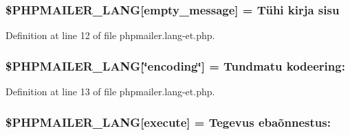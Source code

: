 \subsubsection[{\texorpdfstring{\$\+P\+H\+P\+M\+A\+I\+L\+E\+R\+\_\+\+L\+A\+NG}{$PHPMAILER_LANG}}]{\setlength{\rightskip}{0pt plus 5cm}\$P\+H\+P\+M\+A\+I\+L\+E\+R\+\_\+\+L\+A\+NG\mbox{[}\textquotesingle{}empty\+\_\+message\textquotesingle{}\mbox{]} = \textquotesingle{}Tühi kirja sisu\textquotesingle{}}\hypertarget{phpmailer_8lang-et_8php_a33772099f637c9d6c2cd7425e0e37fed}{}\label{phpmailer_8lang-et_8php_a33772099f637c9d6c2cd7425e0e37fed}


Definition at line 12 of file phpmailer.\+lang-\/et.\+php.

\subsubsection[{\texorpdfstring{\$\+P\+H\+P\+M\+A\+I\+L\+E\+R\+\_\+\+L\+A\+NG}{$PHPMAILER_LANG}}]{\setlength{\rightskip}{0pt plus 5cm}\$P\+H\+P\+M\+A\+I\+L\+E\+R\+\_\+\+L\+A\+NG\mbox{[}\char`\"{}encoding\char`\"{}\mbox{]} = \textquotesingle{}Tundmatu kodeering\+: \textquotesingle{}}\hypertarget{phpmailer_8lang-et_8php_a91dcbbc49ce0c4ca35a4d547ca347c21}{}\label{phpmailer_8lang-et_8php_a91dcbbc49ce0c4ca35a4d547ca347c21}


Definition at line 13 of file phpmailer.\+lang-\/et.\+php.

\subsubsection[{\texorpdfstring{\$\+P\+H\+P\+M\+A\+I\+L\+E\+R\+\_\+\+L\+A\+NG}{$PHPMAILER_LANG}}]{\setlength{\rightskip}{0pt plus 5cm}\$P\+H\+P\+M\+A\+I\+L\+E\+R\+\_\+\+L\+A\+NG\mbox{[}\textquotesingle{}execute\textquotesingle{}\mbox{]} = \textquotesingle{}Tegevus ebaõnnestus\+: \textquotesingle{}}\hypertarget{phpmailer_8lang-et_8php_a668217a9563a168f30f2a8548b6ed5a9}{}\label{phpmailer_8lang-et_8php_a668217a9563a168f30f2a8548b6ed5a9}


